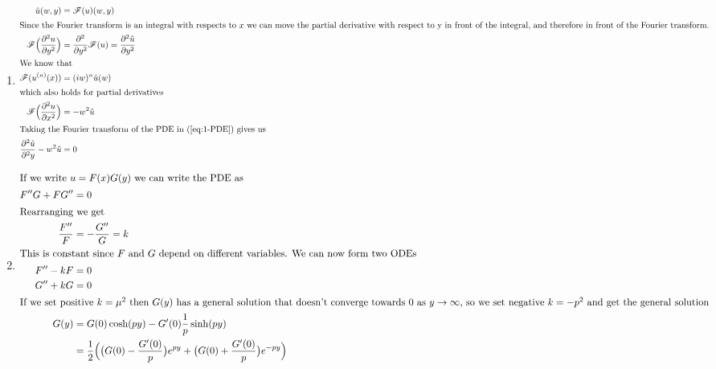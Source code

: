 \documentclass[a4paper]{article}
\begin{document}
\begin{enumerate}[label=\alph*)]
    \item
        \begin{align}
            \hat u(w,y) &= \mathscr{F}(u)(w,y) \\
            \intertext{Since the Fourier transform is an integral with respects
                to \(x\) we can move the partial derivative with respect to y
                in front of the integral, and therefore in front of the Fourier
                transform.}
            \mathscr{F}\Big(\frac{\partial^2u}{\partial y^2}\Big) &= 
                \frac{\partial^2}{\partial y^2}\mathscr{F}(u) = 
                \frac{\partial^2\hat u}{\partial y^2}\\
            \intertext{We know that}
            \mathscr{F}(u^{(n)}(x)) &= (iw)^n\hat u(w) \\
            \intertext{which also holds for partial derivatives}
            \mathscr{F}\Big( \frac{\partial^2u}{\partial x^2}\Big) &= -w^2\hat u \\
            \intertext{Taking the Fourier transform of the PDE in
                (\ref{eq:1-PDE}) gives us}
            \frac{\partial^2\hat u}{\partial^2y} - w^2\hat u &= 0
        \end{align}

    \item
        \begin{align}
            \intertext{If we write \(u = F(x)G(y)\) we can write the PDE as}
            F''G + FG'' &= 0 \\
            \intertext{Rearranging we get} 
            \frac{F''}{F} &= - \frac{G''}{G} = k \\
            \intertext{This is constant since \(F\) and \(G\) depend on
                different variables. We can now form two ODEs}
            F'' -kF &= 0 \\
            G'' +kG &= 0 \\
            \intertext{If we set positive \(k = \mu^2\) then \(G(y)\) has a
                general solution that doesn't converge towards 0 as \(y \to
                \infty\), so we set negative \(k = -p^2\) and get the general
                solution}
            G(y) &= G(0)\cosh(py) - G'(0) \frac{1}{p}\sinh(py) \\
            &= \frac{1}{2} \Big( \big(G(0)-\frac{G'(0)}{p}\big)e^{py} + \big(G(0) +
                \frac{G'(0)}{p}\big)e^{-py} \Big) \\
        \end{align}
\end{enumerate}
\end{document}
